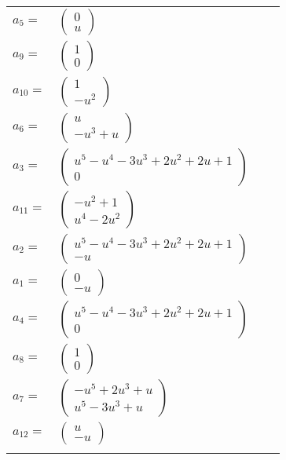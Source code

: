 \documentclass[1p]{elsarticle_modified}
\theoremstyle{definition}
\begin{document}
\begin{tabular}{m{7pt} m{180pt} m{7pt} m{180pt} }
\flushright $a_{5}=$&$\begin{pmatrix}0\\u\end{pmatrix}$ \\
\flushright $a_{9}=$&$\begin{pmatrix}1\\0\end{pmatrix}$ \\
\flushright $a_{10}=$&$\begin{pmatrix}1\\- u^2\end{pmatrix}$ \\
\flushright $a_{6}=$&$\begin{pmatrix}u\\- u^3+u\end{pmatrix}$ \\
\flushright $a_{3}=$&$\begin{pmatrix}u^5- u^4-3 u^3+2 u^2+2 u+1\\0\end{pmatrix}$ \\
\flushright $a_{11}=$&$\begin{pmatrix}- u^2+1\\u^4-2 u^2\end{pmatrix}$ \\
\flushright $a_{2}=$&$\begin{pmatrix}u^5- u^4-3 u^3+2 u^2+2 u+1\\- u\end{pmatrix}$ \\
\flushright $a_{1}=$&$\begin{pmatrix}0\\- u\end{pmatrix}$ \\
\flushright $a_{4}=$&$\begin{pmatrix}u^5- u^4-3 u^3+2 u^2+2 u+1\\0\end{pmatrix}$ \\
\flushright $a_{8}=$&$\begin{pmatrix}1\\0\end{pmatrix}$ \\
\flushright $a_{7}=$&$\begin{pmatrix}- u^5+2 u^3+u\\u^5-3 u^3+u\end{pmatrix}$ \\
\flushright $a_{12}=$&$\begin{pmatrix}u\\- u\end{pmatrix}$\\&\end{tabular}
\end{document}
